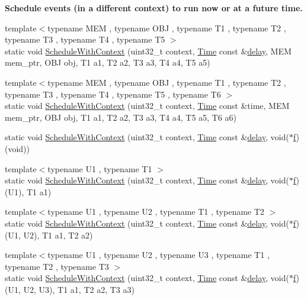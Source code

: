 \begin{Indent}{\bf Schedule events (in a different context) to run now or at a future time.}
\begin{DoxyCompactItemize}
\item 
{\footnotesize template$<$typename M\+EM , typename O\+BJ , typename T1 , typename T2 , typename T3 , typename T4 , typename T5 $>$ }\\static void \hyperlink{classns3_1_1Simulator_a0e163d8aef9e6030ab2b4c1e8c4a2274}{Schedule\+With\+Context} (uint32\+\_\+t context, \hyperlink{classns3_1_1Time}{Time} const \&\hyperlink{mmwave_2model_2fading-traces_2fading__trace__generator_8m_a7964e6aa8f61a9d28973c8267a606ad8}{delay}, M\+EM mem\+\_\+ptr, O\+BJ obj, T1 a1, T2 a2, T3 a3, T4 a4, T5 a5)
\item 
{\footnotesize template$<$typename M\+EM , typename O\+BJ , typename T1 , typename T2 , typename T3 , typename T4 , typename T5 , typename T6 $>$ }\\static void \hyperlink{classns3_1_1Simulator_a39eb86276adccd4b2d1027839ac347da}{Schedule\+With\+Context} (uint32\+\_\+t context, \hyperlink{classns3_1_1Time}{Time} const \&time, M\+EM mem\+\_\+ptr, O\+BJ obj, T1 a1, T2 a2, T3 a3, T4 a4, T5 a5, T6 a6)
\item 
static void \hyperlink{classns3_1_1Simulator_aa546d562895d329b81d0e49d981c1997}{Schedule\+With\+Context} (uint32\+\_\+t context, \hyperlink{classns3_1_1Time}{Time} const \&\hyperlink{mmwave_2model_2fading-traces_2fading__trace__generator_8m_a7964e6aa8f61a9d28973c8267a606ad8}{delay}, void($\ast$\hyperlink{80211b_8c_ae7ffc1a8f84fa47a0812b2f2b9627132}{f})(void))
\item 
{\footnotesize template$<$typename U1 , typename T1 $>$ }\\static void \hyperlink{classns3_1_1Simulator_ae3afd5798810e2f5a3befbfd33221b1c}{Schedule\+With\+Context} (uint32\+\_\+t context, \hyperlink{classns3_1_1Time}{Time} const \&\hyperlink{mmwave_2model_2fading-traces_2fading__trace__generator_8m_a7964e6aa8f61a9d28973c8267a606ad8}{delay}, void($\ast$\hyperlink{80211b_8c_ae7ffc1a8f84fa47a0812b2f2b9627132}{f})(U1), T1 a1)
\item 
{\footnotesize template$<$typename U1 , typename U2 , typename T1 , typename T2 $>$ }\\static void \hyperlink{classns3_1_1Simulator_a25efc16c5086625d534013eaeb372d7a}{Schedule\+With\+Context} (uint32\+\_\+t context, \hyperlink{classns3_1_1Time}{Time} const \&\hyperlink{mmwave_2model_2fading-traces_2fading__trace__generator_8m_a7964e6aa8f61a9d28973c8267a606ad8}{delay}, void($\ast$\hyperlink{80211b_8c_ae7ffc1a8f84fa47a0812b2f2b9627132}{f})(U1, U2), T1 a1, T2 a2)
\item 
{\footnotesize template$<$typename U1 , typename U2 , typename U3 , typename T1 , typename T2 , typename T3 $>$ }\\static void \hyperlink{classns3_1_1Simulator_a644a461a5cef7fb4252467607eab6141}{Schedule\+With\+Context} (uint32\+\_\+t context, \hyperlink{classns3_1_1Time}{Time} const \&\hyperlink{mmwave_2model_2fading-traces_2fading__trace__generator_8m_a7964e6aa8f61a9d28973c8267a606ad8}{delay}, void($\ast$\hyperlink{80211b_8c_ae7ffc1a8f84fa47a0812b2f2b9627132}{f})(U1, U2, U3), T1 a1, T2 a2, T3 a3)

\end{DoxyCompactItemize}
\end{Indent}
